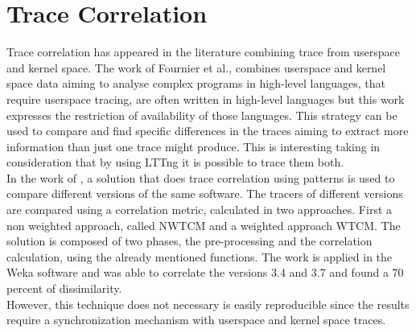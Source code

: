  
\section{Trace Correlation}
Trace correlation has appeared in the literature combining trace from userspace and kernel space. The work of Fournier et al., combines userspace and kernel space data aiming to analyse complex programs in high-level languages, that require userspace tracing, are often written in high-level languages but this work expresses the restriction of availability of those languages. This strategy can be used to compare and find specific differences in the traces aiming to extract more information than just one trace might produce. This is interesting taking in consideration that by using LTTng it is possible to trace them both.\\
In the work of \cite{pattern_based}, a solution that does trace correlation using patterns is used to compare different versions of the same software. The tracers of different versions are compared using a correlation metric, calculated in two approaches. First a non weighted approach, called NW\textunderscore TCM and a weighted approach  W\textunderscore TCM. The solution is composed of two phases, the pre-processing and the correlation calculation, using the already mentioned functions. The work is applied in the Weka \cite{weka} software and was able to correlate the versions 3.4 and 3.7 and found a 70 percent of dissimilarity.\\
However, this technique does not necessary is easily reproducible since the results require a synchronization mechanism with userspace and kernel space traces. 
